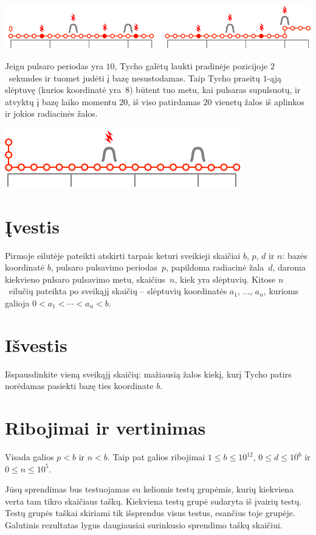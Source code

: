 \includegraphics[width=.8\textwidth]{img/sample1_2.pdf}

Jeigu pulsaro periodas yra $10$, Tycho galėtų laukti pradinėje pozicijoje $2$~sekundes ir tuomet judėti į bazę nesustodamas.
Taip Tycho praeitų $1$-ąją slėptuvę (kurios koordinatė yra~$8$) būtent tuo metu, kai pulsaras supulsuotų, ir atvyktų į bazę laiko momentu $20$, iš viso patirdamas $20$ vienetų žalos iš aplinkos ir jokios radiacinės žalos.	

\includegraphics[width=.4\textwidth]{img/sample3.pdf}

\section*{Įvestis}

Pirmoje eilutėje pateikti atskirti tarpais keturi sveikieji skaičiai $b$, $p$, $d$ ir $n$:
bazės koordinatė $b$,
pulsaro pulsavimo periodas~$p$,
papildoma radiacinė žala~$d$, daroma kiekvieno pulsaro pulsavimo metu,
skaičius~$n$, kiek yra slėptuvių.
Kitose $n$~eilučių pateikta po sveikąjį skaičių -- slėptuvių koordinatės $a_1$, $\ldots$, $a_n$, kurioms galioja
$0<a_1<\cdots <a_n< b$. %

\section*{Išvestis}

Išspausdinkite vieną sveikąjį skaičių: mažiausią žalos kiekį, kurį Tycho patirs norėdamas pasiekti bazę ties koordinate $b$.

\section*{Ribojimai ir vertinimas}

Visada galios
$p < b$ %
ir
$n < b$. %
Taip pat galios ribojimai
$1\leq b\leq 10^{12}$, %
$0\leq d \leq 10^6$ %
ir
$0\leq n \leq 10^5$. %

Jūsų sprendimas bus testuojamas su keliomis testų grupėmis, kurių kiekviena verta tam tikro skaičiaus taškų.
Kiekviena testų grupė sudaryta iš įvairių testų.
Testų grupės taškai skiriami tik išsprendus visus testus, esančius toje grupėje.
Galutinis rezultatas lygus daugiausiai surinkusio sprendimo taškų skaičiui.

